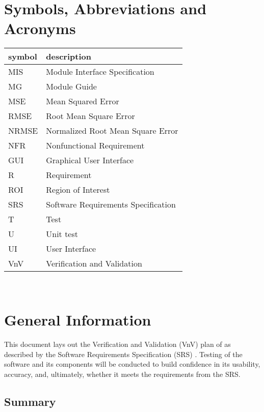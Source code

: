\documentclass[12pt, titlepage]{article}
\begin{document}
\newpage

\tableofcontents

\listoftables

\newpage

\section{Symbols, Abbreviations and Acronyms}

\renewcommand{\arraystretch}{1.2}
\begin{tabular}{l l} 
  \toprule		
  \textbf{symbol} & \textbf{description}\\
  \midrule 
  MIS & Module Interface Specification \\
  MG & Module Guide \\
  MSE & Mean Squared Error\\
  RMSE & Root Mean Square Error\\
  NRMSE & Normalized Root Mean Square Error\\
  NFR & Nonfunctional Requirement\\
  GUI & Graphical User Interface\\
  R & Requirement\\
  ROI & Region of Interest\\
  SRS & Software Requirements Specification\\
  T & Test\\
  U & Unit test\\
  UI & User Interface\\
  VnV & Verification and Validation\\
  \bottomrule
\end{tabular}\\

\newpage


\section{General Information}

This document lays out the Verification and Validation (VnV) plan of \progname{}
as described by the Software Requirements Specification (SRS) 
\citep{SRS}. Testing of the software and its components will be conducted to build confidence in 
its usability, accuracy, and, ultimately, whether it meets the requirements from the SRS.

\subsection{Summary}
\end{document}
